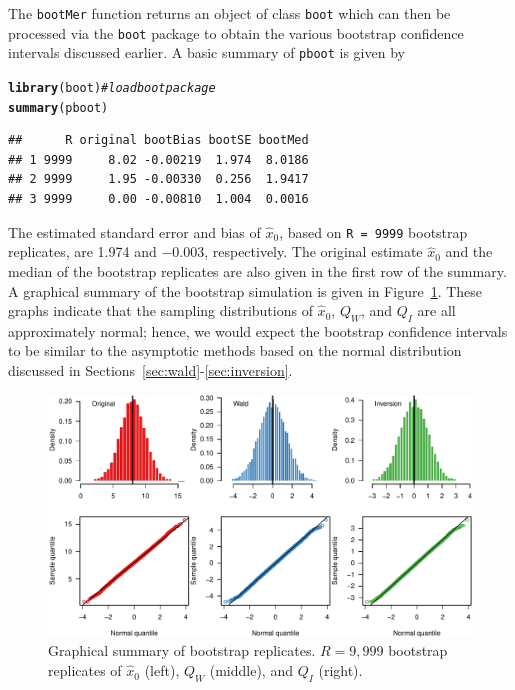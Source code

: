\documentclass{article}\usepackage[]{graphicx}\usepackage[]{color}
\makeatletter
\newcommand{\hlcom}[1]{\textcolor[rgb]{0.678,0.584,0.686}{\textit{#1}}}%
\newcommand{\hlstd}[1]{\textcolor[rgb]{0.345,0.345,0.345}{#1}}%
\newcommand{\hlkwd}[1]{\textcolor[rgb]{0.737,0.353,0.396}{\textbf{#1}}}%
\newenvironment{kframe}{%
 \def\at@end@of@kframe{}%
 \ifinner\ifhmode%
  \def\at@end@of@kframe{\end{minipage}}%
  \begin{minipage}{\columnwidth}%
 \fi\fi%
 \def\FrameCommand##1{\hskip\@totalleftmargin \hskip-\fboxsep
 \colorbox{shadecolor}{##1}\hskip-\fboxsep
     \hskip-\linewidth \hskip-\@totalleftmargin \hskip\columnwidth}%
 \MakeFramed {\advance\hsize-\width
   \@totalleftmargin\z@ \linewidth\hsize
   \@setminipage}}%
 {\par\unskip\endMakeFramed%
 \at@end@of@kframe}
\newenvironment{knitrout}{}{} %
\makeatother
\begin{document}
The \texttt{bootMer} function returns an object of class \texttt{boot} which can then be processed via the \texttt{boot} package to obtain the various bootstrap confidence intervals discussed earlier.  A basic summary of \texttt{pboot} is given by
\begin{knitrout}
\color{fgcolor}\begin{kframe}
\begin{alltt}
\hlkwd{library}\hlstd{(boot)}  \hlcom{# load boot package}
\hlkwd{summary}\hlstd{(pboot)}
\end{alltt}
\begin{verbatim}
##      R original bootBias bootSE bootMed
## 1 9999     8.02 -0.00219  1.974  8.0186
## 2 9999     1.95 -0.00330  0.256  1.9417
## 3 9999     0.00 -0.00810  1.004  0.0016
\end{verbatim}
\end{kframe}
\end{knitrout}
The estimated standard error and bias of $\widehat{x}_0$, based on \texttt{R = 9999} bootstrap replicates, are 1.974 and \ensuremath{-0.003}, respectively.  The original estimate $\widehat{x}_0$ and the median of the bootstrap replicates are also given in the first row of the summary.  A graphical summary of the bootstrap simulation is given in Figure~\ref{fig:boot-plots}.  These graphs indicate that the sampling distributions of $\widehat{x}_0$, $Q_W$, and $Q_I$ are all approximately normal; hence, we would expect the bootstrap confidence intervals to be similar to the asymptotic methods based on the normal distribution discussed in Sections~\ref{sec:wald}-\ref{sec:inversion}.
\begin{knitrout}
\color{fgcolor}\begin{figure}[!htb]
\includegraphics[width=\linewidth]{figure/boot-plots-1} \caption[Graphical summary of bootstrap replicates]{Graphical summary of bootstrap replicates. $R = 9,999$ bootstrap replicates of $\widehat{x}_0$ (left), $Q_W$ (middle), and $Q_I$ (right).}\label{fig:boot-plots}
\end{figure}


\end{knitrout}
\end{document}
